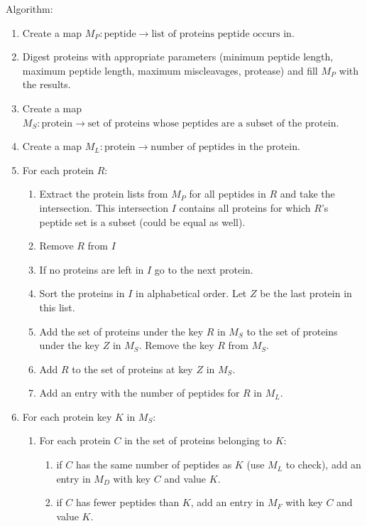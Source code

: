 \documentclass{article}
\begin{document}
\bigskip
Algorithm:
\begin{enumerate}
 \item Create a map $M_P: \mbox{peptide} \to \mbox{list of proteins
peptide occurs in}$.
 \item Digest proteins with appropriate parameters (minimum peptide
length, maximum peptide length, maximum miscleavages, protease) and
fill $M_P$ with the results.
 \item Create a map $M_S: \mbox{protein} \to \mbox{set of proteins
whose peptides are a subset of the protein}$.
 \item Create a map $M_L: \mbox{protein} \to \mbox{number of peptides
in the protein}$.
 \item For each protein $R$:
 \begin{enumerate}
  \item Extract the protein lists from $M_P$ for all peptides in $R$
and take the intersection. This intersection $I$ contains all
proteins for which $R$'s peptide set is a subset (could be equal as
well).
  \item Remove $R$ from $I$
  \item If no proteins are left in $I$ go to the next
protein.
  \item Sort the proteins in $I$ in alphabetical order. Let $Z$ be the
last protein in this list.
  \item Add the set of proteins under the key $R$ in $M_S$ to the set
of proteins under the key $Z$ in $M_S$. Remove the key $R$ from $M_S$.
  \item Add $R$ to the set of proteins at key $Z$ in $M_S$.
  \item Add an entry with the number of peptides for $R$ in $M_L$.
 \end{enumerate}
 \item For each protein key $K$ in $M_S$:
 \begin{enumerate}
  \item For each protein $C$ in the set of proteins belonging to $K$:
  \begin{enumerate}
   \item if $C$ has the same number of peptides as $K$ (use $M_L$ to
check), add an entry in $M_D$ with key $C$ and value $K$.
   \item if $C$ has fewer peptides than $K$, add an entry in $M_F$
with key $C$ and value $K$.
  \end{enumerate}
 \end{enumerate}
\end{enumerate}
\end{document}
